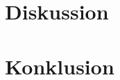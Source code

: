 \documentclass{article}
\begin{document}

\tableofcontents
\newpage



\newpage

\newpage

\newpage


\newpage




\section{Diskussion}
\section{Konklusion}
\newpage
\printbibliography

\newpage

\end{document}
